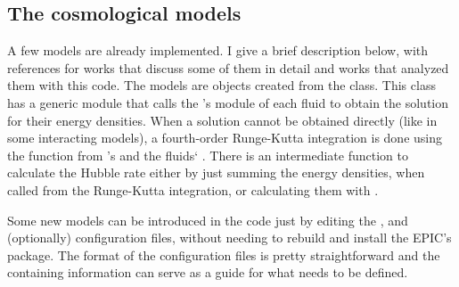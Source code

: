 \documentclass[letterpaper,12pt,english]{sphinxhowto}
\begin{document}
\noindent{}


\subsection{The cosmological models}
\label{\detokenize{themodels:the-cosmological-models}}\label{\detokenize{themodels::doc}}\label{\detokenize{themodels:modelssec}}
A few models are already implemented. I give a brief description below,
with references for works that discuss some of them in detail and works that
analyzed them with this code.
The models are objects created from the  class.
This class has a generic module  that calls the ’s
module  of each fluid to obtain the solution for their energy
densities.
When a solution cannot be obtained directly (like in some interacting models),
a fourth-order Runge-Kutta integration is done using the function
 from ’s  and the fluids{}`
.
There is an intermediate function  to calculate the
Hubble rate either by just summing the energy densities, when called from the
Runge-Kutta integration, or calculating them with .

Some new models can be introduced in the code just by editing the
,  and (optionally)
 configuration files, without needing to
rebuild and install the EPIC’s package.
The format of the configuration  files is pretty straightforward and
the containing information can serve as a guide for what needs to be defined.
\end{document}
